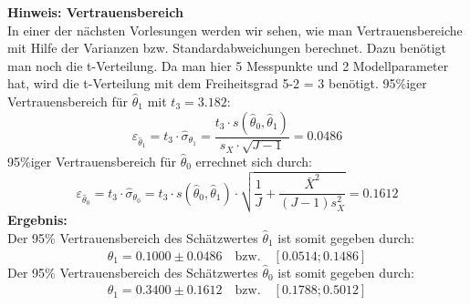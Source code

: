 \textbf{Hinweis: Vertrauensbereich} \\
In einer der nächsten Vorlesungen werden wir sehen, wie man Vertrauensbereiche 
mit Hilfe der Varianzen bzw. Standardabweichungen berechnet. Dazu benötigt man 
noch die t-Verteilung. Da man hier 5 Messpunkte und 2 Modellparameter hat,
wird die t-Verteilung mit dem Freiheitsgrad 5-2 = 3 benötigt. 
95\%iger Vertrauensbereich für $\hat\theta_1$ mit $t_3 = 3.182$: 
\[
\varepsilon _{\hat{\theta}_1} = t_3 \cdot \hat\sigma_{\theta_1} = \frac{t_3 \cdot s(\hat{\theta}_0 ,
	\hat{\theta}_1 )}{s_X \cdot \sqrt {J
		- 1} } = 0.0486
\]
95\%iger Vertrauensbereich für $\hat\theta_0$ errechnet sich durch:
\[
\varepsilon _{\hat{\theta}_0} = t_3 \cdot \hat\sigma_{\theta_0} = t_3 \cdot s(\hat{\theta}_0 ,\hat{\theta}_1 ) \cdot \sqrt {\frac{1}{J} + \frac{\bar {X}^2}{(J - 1) s_X^2 }} = 0.1612
\]
\textbf{Ergebnis:} \\ 
Der 95\% Vertrauensbereich des Schätzwertes $\hat\theta_1$ ist somit gegeben durch:
\begin{equation}
\hat\theta_1 = 0.1000 \pm 0.0486 \quad \text{bzw.} \quad [0.0514;0.1486]
\end{equation}
Der 95\% Vertrauensbereich des Schätzwertes $\hat\theta_0$ ist somit gegeben durch: 
\begin{equation}
\hat\theta_1 = 0.3400 \pm 0.1612 \quad \text{bzw.} \quad [0.1788;0.5012]
\end{equation}

